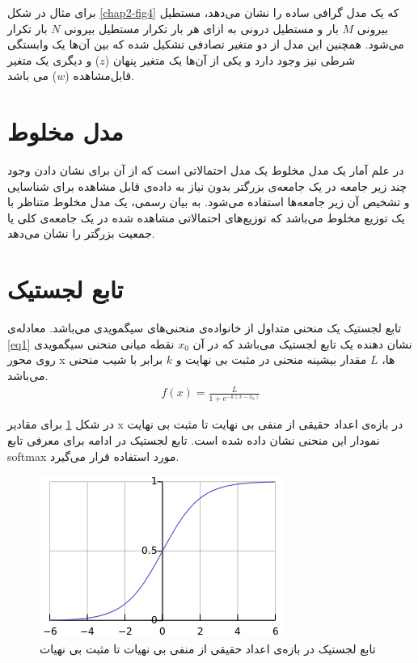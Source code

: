 برای مثال در شکل
\ref{chap2-fig4}
که یک مدل گرافی ساده را نشان می‌‌دهد، مستطیل بیرونی
$M$
بار و مستطیل درونی به ازای هر بار تکرار مستطیل بیرونی
$N$
بار تکرار می‌‌شود. همچنین این مدل از دو متغیر تصادفی تشکیل شده که بین آن‌ها یک وابستگی شرطی نیز وجود دارد و یکی‌ از آن‌ها یک متغیر پنهان
($z$)
و دیگری یک متغیر قابل‌مشاهده
($w$)
می‌ باشد.
\section{مدل مخلوط}
در علم آمار یک مدل مخلوط
یک مدل احتمالاتی است که از آن برای نشان دادن وجود چند زیر جامعه
در یک جامعه‌ی بزرگتر بدون نیاز به داده‌ی قابل مشاهده برای شناسایی‌ و تشخیص آن زیر جامعه‌ها استفاده می‌‌‌شود. به بیان رسمی‌، یک مدل مخلوط متناظر با یک توزیع مخلوط
 می‌‌باشد که توزیع‌های احتمالاتی مشاهده شده در یک جامعه‌ی کلی‌ یا جمعیت بزرگتر را نشان می‌‌دهد.
	
\section{تابع لجستیک}
تابع لجستیک
 یک منحنی متداول از خانواده‌ی منحنی‌های سیگمویدی
  می‌‌باشد. معاد‌له‌ی
\ref{eq1}
نشان دهنده یک تابع لجستیک می‌‌باشد که در آن
$x_0$
نقطه میانی منحنی سیگمویدی روی محور
x
ها،
$L$
مقدار بیشینه منحنی در مثبت بی‌ نهایت و
$k$
برابر با شیب منحنی می‌‌باشد.
\begin{align}
f(x) = \frac{L}{1+e^{-k(x-x_0)}}
\label{eq1}
\end{align}

 در شکل
\ref{fig3}
برای مقادیر x در بازه‌ی اعداد حقیقی‌ از منفی‌ بی‌ نهایت تا مثبت بی‌ نهایت نمودار این منحنی نشان داده شده است. تابع لجستیک در ادامه برای معرفی تابع
softmax
مورد استفاده قرار می‌‌گیرد.
\begin{figure}[!h]
	\centering
	\includegraphics[scale=0.5]{chap2-img/logistic_function}
	\caption{تابع لجستیک در بازه‌ی اعداد حقیقی‌ از منفی‌ بی‌ نهیات تا مثبت بی‌ نهیات }
	\label{fig3}
\end{figure}

